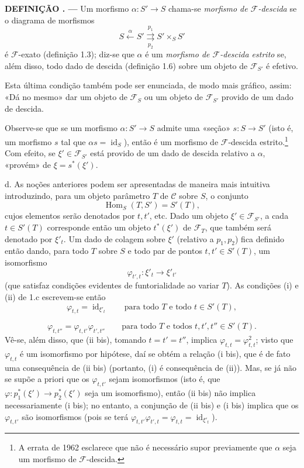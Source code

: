 \documentclass[11pt,twoside,openany]{book}
\numberwithin{equation}{section}
\newcommand{\src}[1]{%
  \phantomsection\hypertarget{src:#1}{}%
  \marginpar{\raggedleft\footnotesize\sffamily #1}%
}
\theoremstyle{plain}
\theoremstyle{definition}
\theoremstyle{remark}
\newcommand{\result}[2]{%
  \par\medskip\noindent\textbf{#1%
  \if\relax\detokenize{#2}\relax\else\space#2\fi. ---}\enspace
}
\newcommand{\FgaUnitKey}{frontmatter}
\renewcommand{\src}[1]{%
  \phantomsection\hypertarget{src:\FgaUnitKey:#1}{}%
  \marginpar{\raggedleft\footnotesize\sffamily #1}%
}
\begin{document}
\result{DEFINIÇÃO}{1.7} Um morfismo $\alpha:S'\longrightarrow S$ chama-se
\emph{morfismo de $\mathcal F$-descida} se o diagrama de morfismos
\[
  S\xleftarrow{\alpha}S'
  \overset{p_1}{\underset{p_2}{\rightrightarrows}}S'\times_S S'
\]
é $\mathcal F$-exato (definição 1.3); diz-se que $\alpha$ é um
\emph{morfismo de $\mathcal F$-descida estrito} se, além disso, todo dado de
descida (definição 1.6) sobre um objeto de $\mathcal F_{S'}$ é efetivo.

Esta última condição também pode ser enunciada, de modo mais gráfico, assim:
«Dá no mesmo» dar um objeto de $\mathcal F_S$ ou um objeto de
$\mathcal F_{S'}$ provido de um dado de descida.

Observe-se que se um morfismo $\alpha:S'\longrightarrow S$ admite uma «seção»
$s:S\longrightarrow S'$ (isto é, um morfismo $s$ tal que
$\alpha s=\operatorname{id}_S$), então é um morfismo de
$\mathcal F$-descida estrito.\footnote{A errata de 1962 esclarece que não é
necessário supor previamente que $\alpha$ seja um morfismo de
$\mathcal F$-descida.} Com efeito, se $\xi'\in\mathcal F_{S'}$ está provido de
um dado de descida relativo a $\alpha$, «provém» de
$\xi=s^*(\xi')$.

\medskip\noindent
d. As noções anteriores podem ser apresentadas de maneira mais intuitiva
introduzindo, para um objeto parâmetro $T$ de $\mathcal C$ sobre $S$, o
conjunto
\[
  \operatorname{Hom}_S(T,S')=S'(T),
\]
cujos elementos serão denotados por $t,t'$, etc. Dado um objeto
$\xi'\in\mathcal F_{S'}$, a cada $t\in S'(T)$ corresponde então um objeto
$t^*(\xi')$ de $\mathcal F_T$, que também será denotado por $\xi'_t$. Um dado de
colagem sobre $\xi'$ (relativo a $p_1,p_2$) fica definido então dando, para
todo $T$ sobre $S$ e todo par de pontos $t,t'\in S'(T)$, um isomorfismo
\[
  \varphi_{t',t}:\xi'_t\longrightarrow\xi'_{t'}
\]
(que satisfaz condições evidentes de funtorialidade ao variar $T$). As
condições (i) e (ii) de 1.c escrevem-se então
\[
  \tag{i bis}
  \varphi_{t,t}=\operatorname{id}_{\xi'_t}
  \qquad\text{para todo $T$ e todo $t\in S'(T)$},
\]

\src{304}
\[
  \tag{ii bis}
  \varphi_{t,t''}=\varphi_{t,t'}\varphi_{t',t''}
  \qquad\text{para todo $T$ e todos $t,t',t''\in S'(T)$}.
\]
Vê-se, além disso, que (ii bis), tomando $t=t'=t''$, implica
$\varphi_{t,t}=\varphi_{t,t}^2$; visto que $\varphi_{t,t}$ é um isomorfismo
por hipótese, daí se obtém a relação (i bis), que é de fato uma consequência
de (ii bis) (portanto, (i) é consequência de (ii)). Mas, se já não se supõe
a priori que os $\varphi_{t,t'}$ sejam isomorfismos (isto é, que
$\varphi:p_1^*(\xi')\longrightarrow p_2^*(\xi')$ seja um isomorfismo), então
(ii bis) não implica necessariamente (i bis); no entanto, a conjunção de
(ii bis) e (i bis) implica que os $\varphi_{t,t'}$ são isomorfismos (pois se
terá
$\varphi_{t,t'}\varphi_{t',t}=\varphi_{t,t}=\operatorname{id}_{\xi'_t}$).
\end{document}
